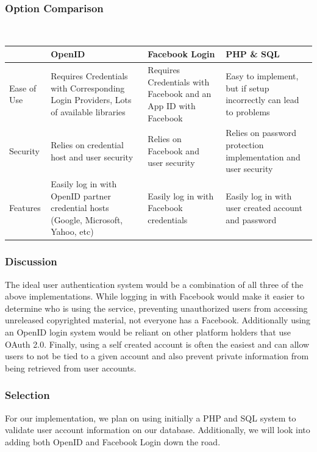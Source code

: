 \documentclass[onecolumn, draftclsnofoot,10pt, compsoc]{IEEEtran}
\begin{document}
{\newpage
\subsubsection{Option Comparison} ~\\

\tablehead{}
\begin{supertabular}{|p{2.5cm}|p{4.5cm}|p{4.5cm}|p{4.5cm}|}
\hline
	& OpenID
	& Facebook Login
	& PHP \& SQL\\ 
\hline
	Ease of Use
	& Requires Credentials with Corresponding Login Providers, Lots of available libraries
	& Requires Credentials with Facebook and an App ID with Facebook
	& Easy to implement, but if setup incorrectly can lead to problems\\ 
\hline
	Security
	& Relies on credential host and user security
	& Relies on Facebook and user security
	& Relies on password protection implementation and user security\\ 
\hline
	Features
	& Easily log in with OpenID partner credential hosts (Google, Microsoft, Yahoo, etc)
	& Easily log in with Facebook credentials
	& Easily log in with user created account and password \\ 
\hline

\end{supertabular}

\medskip

\subsubsection{Discussion}
\noindent The ideal user authentication system would be a combination of all three of the above implementations. While logging in with Facebook would make it easier to determine who is using the service, preventing unauthorized users from accessing unreleased copyrighted material, not everyone has a Facebook. Additionally using an OpenID login system would be reliant on other platform holders that use OAuth 2.0. Finally, using a self created account is often the easiest and can allow users to not be tied to a given account and also prevent private information from being retrieved from user accounts.

\medskip
\subsubsection{Selection}
\noindent For our implementation, we plan on using initially a PHP and SQL system to validate user account information on our database. Additionally, we will look into adding both OpenID and Facebook Login down the road.







}
\end{document}
